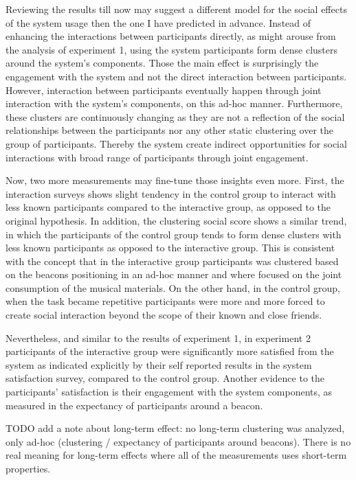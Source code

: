 \documentclass[a4paper,11pt]{article}
\begin{document}
{Reviewing the results till now may suggest a different model for the social effects of the system usage then the one I have predicted in advance.
Instead of enhancing the interactions between participants directly, as might arouse from the analysis of experiment 1, using the system participants form dense clusters around the system's components.
Those the main effect is surprisingly the engagement with the system and not the direct interaction between participants.
However, interaction between participants eventually happen through joint interaction with the system's components, on this ad-hoc manner.
Furthermore, these clusters are continuously changing as they are not a reflection of the social relationships between the participants nor any other static clustering over the group of participants.
Thereby the system create indirect opportunities for social interactions with broad range of participants through joint engagement.

Now, two more measurements may fine-tune those insights even more.
First, the interaction surveys shows slight tendency in the control group to interact with less known participants compared to the interactive group, as opposed to the original hypothesis.
In addition, the clustering social score shows a similar trend, in which the participants of the control group tends to form dense clusters with less known participants as opposed to the interactive group.
This is consistent with the concept that in the interactive group participants was clustered based on the beacons positioning in an ad-hoc manner and where focused on the joint consumption of the musical materials.
On the other hand, in the control group, when the task became repetitive participants were more and more forced to create social interaction beyond the scope of their known and close friends.

Nevertheless, and similar to the results of experiment 1, in experiment 2 participants of the interactive group were significantly more satisfied from the system as indicated explicitly by their self reported results in the system satisfaction survey, compared to the control group.
Another evidence to the participants' satisfaction is their engagement with the system components, as measured in the expectancy of participants around a beacon.

TODO add a note about long-term effect: no long-term clustering was analyzed, only ad-hoc (clustering / expectancy of participants around beacons).
There is no real meaning for long-term effects where all of the measurements uses short-term properties.

}
\end{document}
